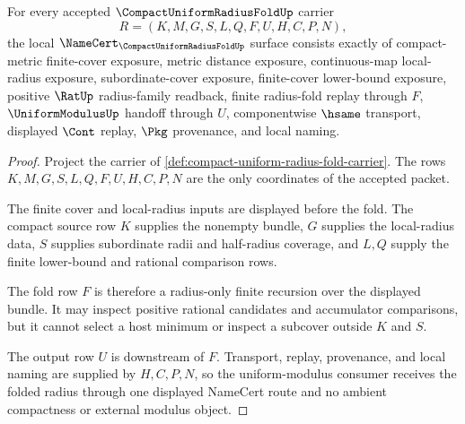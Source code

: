 \begin{theorem}
\label{thm:compact-uniform-radius-fold-namecert-obligations}
For every accepted $\CompactUniformRadiusFoldUp$ carrier
$$
R=(K,M,G,S,L,Q,F,U,H,C,P,N),
$$
the local $\NameCert_{\CompactUniformRadiusFoldUp}$ surface consists exactly of compact-metric finite-cover exposure, metric distance exposure, continuous-map local-radius exposure, subordinate-cover exposure, finite-cover lower-bound exposure, positive $\RatUp$ radius-family readback, finite radius-fold replay through $F$, $\UniformModulusUp$ handoff through $U$, componentwise $\hsame$ transport, displayed $\Cont$ replay, $\Pkg$ provenance, and local naming.
\end{theorem}
\begin{proof}
Project the carrier of \autoref{def:compact-uniform-radius-fold-carrier}. The rows $K,M,G,S,L,Q,F,U,H,C,P,N$ are the only coordinates of the accepted packet.

The finite cover and local-radius inputs are displayed before the fold. The compact source row $K$ supplies the nonempty bundle, $G$ supplies the local-radius data, $S$ supplies subordinate radii and half-radius coverage, and $L,Q$ supply the finite lower-bound and rational comparison rows.

The fold row $F$ is therefore a radius-only finite recursion over the displayed bundle. It may inspect positive rational candidates and accumulator comparisons, but it cannot select a host minimum or inspect a subcover outside $K$ and $S$.

The output row $U$ is downstream of $F$. Transport, replay, provenance, and local naming are supplied by $H,C,P,N$, so the uniform-modulus consumer receives the folded radius through one displayed NameCert route and no ambient compactness or external modulus object.
\end{proof}

